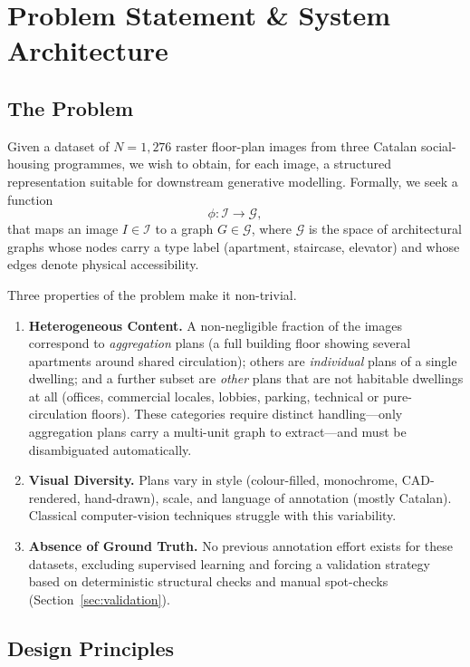 \documentclass[12pt,a4paper,openright]{report}
\begin{document}
\chapter{Problem Statement \& System Architecture}
\label{ch:problem}

\section{The Problem}
\label{sec:problem}

Given a dataset of $N = 1,276$ raster floor-plan images from three Catalan social-housing programmes, we wish to obtain, for each image, a structured representation suitable for downstream generative modelling. Formally, we seek a function
\[
    \phi : \mathcal{I} \longrightarrow \mathcal{G},
\]
that maps an image $I \in \mathcal{I}$ to a graph $G \in \mathcal{G}$, where $\mathcal{G}$ is the space of architectural graphs whose nodes carry a type label (apartment, staircase, elevator) and whose edges denote physical accessibility.

Three properties of the problem make it non-trivial.

\begin{enumerate}
    \item \textbf{Heterogeneous Content.} A non-negligible fraction of the images correspond to \textit{aggregation} plans (a full building floor showing several apartments around shared circulation); others are \textit{individual} plans of a single dwelling; and a further subset are \textit{other} plans that are not habitable dwellings at all (offices, commercial locales, lobbies, parking, technical or pure-circulation floors). These categories require distinct handling---only aggregation plans carry a multi-unit graph to extract---and must be disambiguated automatically.
    \item \textbf{Visual Diversity.} Plans vary in style (colour-filled, monochrome, CAD-rendered, hand-drawn), scale, and language of annotation (mostly Catalan). Classical computer-vision techniques struggle with this variability.
    \item \textbf{Absence of Ground Truth.} No previous annotation effort exists for these datasets, excluding supervised learning and forcing a validation strategy based on deterministic structural checks and manual spot-checks (Section~\ref{sec:validation}).
\end{enumerate}

\section{Design Principles}
\label{sec:principles}
\end{document}
